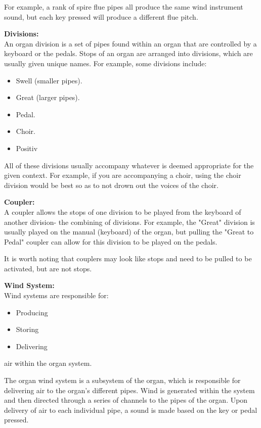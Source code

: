 For example, a rank of spire flue pipes all produce the same wind instrument sound, but each key pressed will produce a different flue pitch.  \cite{organvideo}

\medskip
\noindent \textbf{Divisions:}
\\ \hspace*{0.5cm} An organ division is a set of pipes found within an organ that are controlled by a keyboard or the pedals. Stops of an organ are arranged into divisions, which are usually given unique names. For example, some divisions include:
\begin{itemize}
\item Swell (smaller pipes).
\item Great (larger pipes).
\item Pedal.
\item Choir.
\item Positiv
\end{itemize}

All of these divisions usually accompany whatever is deemed appropriate for the given context. For example, if you are accompanying a choir, using the choir division would be best so as to not drown out the voices of the choir.  \cite{organvideo}

\medskip
\noindent \textbf{Coupler:}
\\ \hspace*{0.5cm} A coupler allows the stops of one division to be played from the keyboard of another division- the combining of divisions. For example, the "Great" division is usually played on the manual (keyboard) of the organ, but pulling the "Great to Pedal" coupler can allow for this division to be played on the pedals.

It is worth noting that couplers may look like stops and need to be pulled to be activated, but are not stops. \cite{organvideo}

\medskip
\noindent \textbf{Wind System:}
\\ \hspace*{0.5cm} Wind systems are responsible for:
\begin{itemize}
\item Producing
\item Storing
\item Delivering
\end{itemize}
air within the organ system.

The organ wind system is a subsystem of the organ, which is responsible for delivering air to the organ's different pipes. Wind is generated within the system and then directed through a series of channels to the pipes of the organ. Upon delivery of air to each individual pipe, a sound is made based on the key or pedal pressed. \cite{organvideo}

